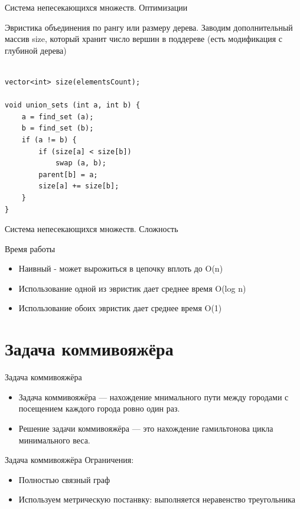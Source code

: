 \documentclass[10pt]{beamer}
\begin{document}
\begin{frame}[fragile]{Система непесекающихся множеств. Оптимизации}

Эвристика объединения по рангу или размеру дерева. Заводим дополнительный массив size, который хранит число вершин в поддереве (есть модификация с глубиной дерева)

\begin{lstlisting}

vector<int> size(elementsCount);

void union_sets (int a, int b) {
	a = find_set (a);
	b = find_set (b);
	if (a != b) {
		if (size[a] < size[b])
			swap (a, b);
		parent[b] = a;
		size[a] += size[b];
	}
}

\end{lstlisting}
\end{frame}

\begin{frame}[fragile]{Система непесекающихся множеств. Сложность}

Время работы

\begin{itemize}
    \item Наивный - может вырожиться в цепочку вплоть до O(n)
    \item Использование одной из эвристик дает среднее время O(log n)
    \item Использование обоих эвристик дает среднее время O(1)
\end{itemize}

\end{frame}

\section{Задача коммивояжёра}
\begin{frame}[fragile]{Задача коммивояжёра}
\begin{itemize}
    \item Задача коммивояжёра — нахождение мнимального пути между городами с посещением каждого города ровно один раз.
    \item Решение задачи коммивояжёра — это нахождение гамильтонова цикла минимального веса.
\end{itemize}
\end{frame}

\begin{frame}[fragile]{Задача коммивояжёра}
Ограничения:
\begin{itemize}
    \item Полностью связный граф
    \item Используем метрическую постанвку: выполняется неравенство треугольника
\end{itemize}
\end{frame}
\end{document}
